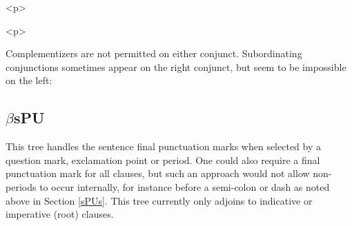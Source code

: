 \begin{rawhtml} <p> \end{rawhtml}
\centering 
\hspace{0.0in} 
\begin{rawhtml} <dl> <dt>{$\beta$sPUs, with features displayed <p> </dl> \end{rawhtml}
\label{sPUs-tree} 
\begin{rawhtml} <p> \end{rawhtml}
 
Complementizers are not permitted on either conjunct. Subordinating 
conjunctions sometimes appear on the right conjunct, but seem to be 
impossible on the left: 
        
\beginsentences
{}\label{ex:447} 
\endsentences

 
\beginsentences
{}\label{ex:448} 
\endsentences

 
 
 
\subsection{$\beta$sPU} 
 
This tree handles the sentence final punctuation marks when selected 
by a question mark, exclamation point or period. One could also 
require a final punctuation mark for all clauses, but such an approach 
would not allow non-periods to occur internally, for instance before a 
semi-colon or dash as noted above in Section \ref{sPUs}. This tree 
currently only adjoins to indicative or imperative (root) clauses. 
 
\beginsentences
{}\label{ex:449} 
\label{ex:450} 
\label{ex:451} 
\endsentences

